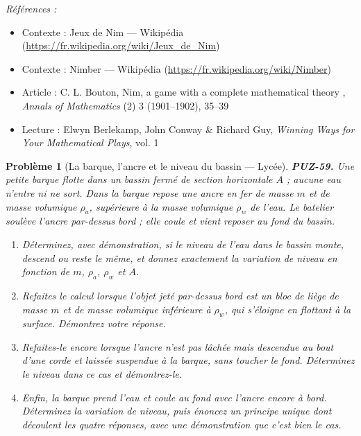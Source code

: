 \documentclass[11pt]{article}
\newtheorem{problem}{Problème}
\newenvironment{refs}{\par\small\noindent\emph{Références :}\begin{itemize}\setlength\itemsep{0pt}}{\end{itemize}\normalsize}
\begin{document}
\begin{refs}
\item Contexte : Jeux de Nim --- Wikipédia (\url{https://fr.wikipedia.org/wiki/Jeux_de_Nim})
\item Contexte : Nimber --- Wikipédia (\url{https://fr.wikipedia.org/wiki/Nimber})
\item Article : C. L. Bouton, \og{} Nim, a game with a complete mathematical theory \fg{}, \textit{Annals of Mathematics} (2) 3 (1901--1902), 35--39
\item Lecture : Elwyn Berlekamp, John Conway \& Richard Guy, \textit{Winning Ways for Your Mathematical Plays}, vol. 1
\end{refs}

\bigskip

\begin{problem}[{La barque, l'ancre et le niveau du bassin --- Lycée}]
\textbf{PUZ-59.} Une petite barque flotte dans un bassin fermé de section horizontale
$ A $ ; aucune eau n'entre ni ne sort. Dans la barque repose une ancre en fer de masse
$ m $ et de masse volumique $ \rho_a $, supérieure à la masse volumique $ \rho_w $ de
l'eau. Le batelier soulève l'ancre par-dessus bord ; elle coule et vient reposer au fond du
bassin.
\begin{enumerate}
\item[(a)] Déterminez, avec démonstration, si le niveau de l'eau dans le bassin monte, descend ou
reste le même, et donnez exactement la variation de niveau en fonction de $ m $,
$ \rho_a $, $ \rho_w $ et $ A $.
\item[(b)] Refaites le calcul lorsque l'objet jeté par-dessus bord est un bloc de liège de masse
$ m $ et de masse volumique inférieure à $ \rho_w $, qui s'éloigne en flottant à la
surface. Démontrez votre réponse.
\item[(c)] Refaites-le encore lorsque l'ancre n'est pas lâchée mais descendue au bout d'une corde
et laissée suspendue à la barque, sans toucher le fond. Déterminez le niveau dans ce cas et
démontrez-le.
\item[(d)] Enfin, la barque prend l'eau et coule au fond avec l'ancre encore à bord. Déterminez la
variation de niveau, puis énoncez un principe unique dont découlent les quatre réponses,
avec une démonstration que c'est bien le cas.
\end{enumerate}

\end{problem}
\end{document}
